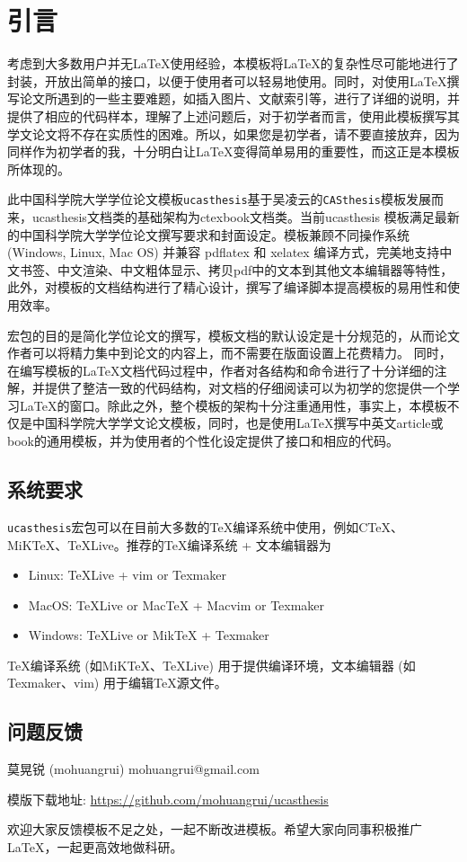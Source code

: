 
\chapter{引言}
\label{chap:introduction}

考虑到大多数用户并无\LaTeX{}使用经验，本模板将\LaTeX{}的复杂性尽可能地进行了封装，开放出简单的接口，以便于使用者可以轻易地使用。同时，对使用\LaTeX{}撰写论文所遇到的一些主要难题，如插入图片、文献索引等，进行了详细的说明，并提供了相应的代码样本，理解了上述问题后，对于初学者而言，使用此模板撰写其学文论文将不存在实质性的困难。所以，如果您是初学者，请不要直接放弃，因为同样作为初学者的我，十分明白让\LaTeX{}变得简单易用的重要性，而这正是本模板所体现的。

此中国科学院大学学位论文模板\texttt{ucasthesis}基于吴凌云的\texttt{CASthesis}模板发展而来，ucasthesis文档类的基础架构为ctexbook文档类。当前ucasthesis 模板满足最新的中国科学院大学学位论文撰写要求和封面设定。模板兼顾不同操作系统 (Windows, Linux, Mac OS) 并兼容 pdflatex 和 xelatex 编译方式，完美地支持中文书签、中文渲染、中文粗体显示、拷贝pdf中的文本到其他文本编辑器等特性，此外，对模板的文档结构进行了精心设计，撰写了编译脚本提高模板的易用性和使用效率。

宏包的目的是简化学位论文的撰写，模板文档的默认设定是十分规范的，从而论文作者可以将精力集中到论文的内容上，而不需要在版面设置上花费精力。 同时，在编写模板的\LaTeX{}文档代码过程中，作者对各结构和命令进行了十分详细的注解，并提供了整洁一致的代码结构，对文档的仔细阅读可以为初学的您提供一个学习\LaTeX{}的窗口。除此之外，整个模板的架构十分注重通用性，事实上，本模板不仅是中国科学院大学学文论文模板，同时，也是使用\LaTeX{}撰写中英文article或book的通用模板，并为使用者的个性化设定提供了接口和相应的代码。

\section{系统要求}

\texttt{ucasthesis}宏包可以在目前大多数的\TeX{}编译系统中使用，例如C\TeX{}、MiK\TeX{}、\TeX{}Live。推荐的\TeX{}编译系统 + 文本编辑器为
\begin{itemize}
    \item Linux: \TeX{}Live + vim or Texmaker
    \item MacOS: \TeX{}Live or Mac\TeX{} + Macvim or Texmaker
    \item Windows: \TeX{}Live or Mik\TeX{}  + Texmaker
\end{itemize}
\TeX{}编译系统 (如MiK\TeX{}、\TeX{}Live) 用于提供编译环境，文本编辑器 (如Texmaker、vim) 用于编辑\TeX{}源文件。

\section{问题反馈}

\begin{center}
莫晃锐 (mohuangrui) \quad mohuangrui@gmail.com

模版下载地址: \url{https://github.com/mohuangrui/ucasthesis}
\end{center}

欢迎大家反馈模板不足之处，一起不断改进模板。希望大家向同事积极推广\LaTeX{}，一起更高效地做科研。
